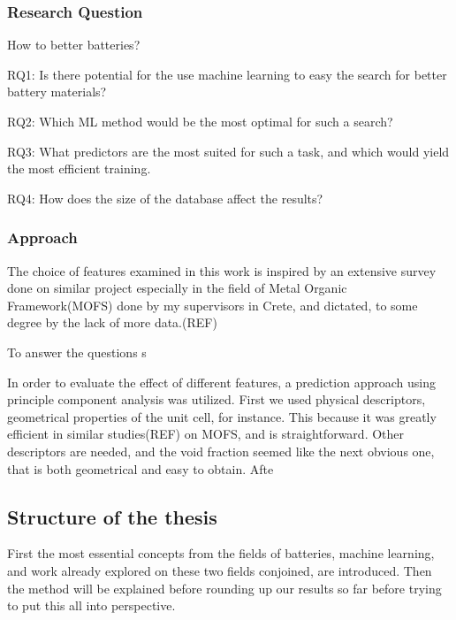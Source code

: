 \subsubsection{Research Question}

How to better batteries?

RQ1: Is there potential for the use machine learning to easy the search for better battery materials?

RQ2: Which ML method would be the most optimal for such a search?

RQ3: What predictors are the most suited for such a task, and which would yield the most efficient training.

RQ4: How does the size of the database affect the results? 

\subsubsection{Approach}

The choice of features examined in this work is inspired by an extensive survey done on similar project especially in the field of Metal Organic Framework(MOFS) done by my supervisors in Crete, and dictated, to some degree by the lack of more data.(REF)

To answer the questions s

In order to evaluate the effect of different features, a prediction approach using principle component analysis was utilized. First we used physical descriptors, geometrical properties of the unit cell, for instance. This because it was greatly efficient in similar studies(REF) on MOFS, and is straightforward. 
Other descriptors are needed, and the void fraction seemed like the next obvious one, that is both geometrical and easy to obtain. Afte

\subsection{Structure of the thesis}

First the most essential concepts from the fields of batteries, machine learning, and work already explored on these two fields conjoined, are introduced. Then the method will be explained before rounding up our results so far before trying to put this all into perspective.
